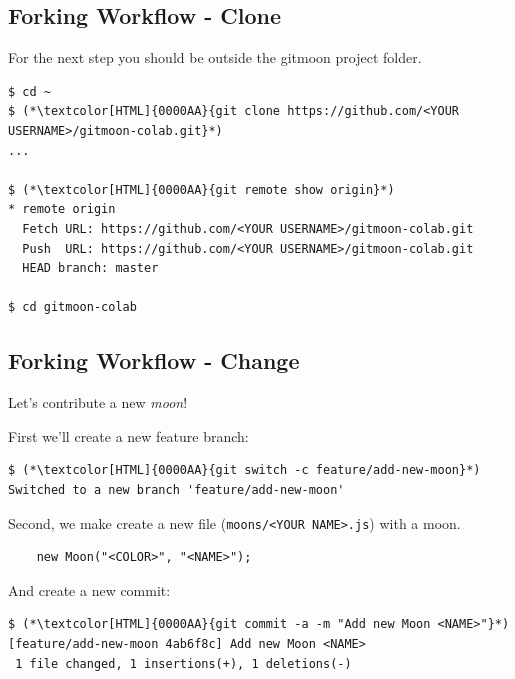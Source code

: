 \subsection{Forking Workflow - Clone}
\begin{frame}[fragile]
  \subslidetitle

  For the next step you should be outside the gitmoon project folder.

  \begin{lstlisting}
$ cd ~
$ (*\textcolor[HTML]{0000AA}{git clone https://github.com/<YOUR USERNAME>/gitmoon-colab.git}*)
...

$ (*\textcolor[HTML]{0000AA}{git remote show origin}*)
* remote origin
  Fetch URL: https://github.com/<YOUR USERNAME>/gitmoon-colab.git
  Push  URL: https://github.com/<YOUR USERNAME>/gitmoon-colab.git
  HEAD branch: master

$ cd gitmoon-colab
\end{lstlisting}

\end{frame}

\subsection{Forking Workflow - Change}
\begin{frame}[fragile]
  \subslidetitle

  Let's contribute a new \textit{moon}!
  \vspace{1em}

  First we'll create a new feature branch:

  \begin{lstlisting}
$ (*\textcolor[HTML]{0000AA}{git switch -c feature/add-new-moon}*)
Switched to a new branch 'feature/add-new-moon'
\end{lstlisting}

  Second, we make create a new file (\lstinline{moons/<YOUR NAME>.js}) with a moon.

  \begin{lstlisting}
    new Moon("<COLOR>", "<NAME>");
\end{lstlisting}

  And create a new commit:
  \begin{lstlisting}
$ (*\textcolor[HTML]{0000AA}{git commit -a -m "Add new Moon <NAME>"}*)
[feature/add-new-moon 4ab6f8c] Add new Moon <NAME>
 1 file changed, 1 insertions(+), 1 deletions(-)
\end{lstlisting}

\end{frame}

